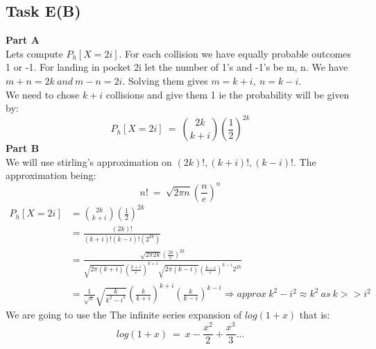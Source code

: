 \documentclass[12pt]{article}
\begin{document}
\subsection{Task E(B)}
\textbf{Part A}
\\
Lets compute $P_{h}[X=2i]$. For each collision we have equally probable outcomes 1 or -1. For landing in pocket 2i let the number of 1's and -1's be m, n.
We have $m+n=2k \ and\ m-n=2i$. Solving them gives $m=k+i,\ n=k-i$. \\
We need to chose $k+i$ collisions and give them 1 ie the probability will be given by:
\begin{equation}
    P_{h}[X=2i]\ =\ \binom{2k}{k+i}\left(\frac{1}{2}\right)^{2k} 
\end{equation} 
\textbf{Part B} \\
We will use stirling's approximation on $(2k)!,(k+i)!,(k-i)!$. The approximation being:
\[n!\ =\ \sqrt{2\pi n}\left(\frac{n}{e}\right)^{n}\]
\begin{equation}
\begin{split}
    P_{h}[X=2i] &=\binom{2k}{k+i}\left(\frac{1}{2}\right)^{2k} \\
                &=\frac{(2k)!}{(k+i)!(k-i)!(2^{2k})} \\
                &=\frac{\sqrt{2\pi 2k}\left(\frac{2k}{e}\right)^{2k}}{\sqrt{2\pi (k+i)}\left(\frac{k+i}{e}\right)^{k+i}\sqrt{2\pi (k-i)}\left(\frac{k-i}{e}\right)^{k-i}2^{2k}} \\
                &=\frac{1}{\sqrt{\pi}}\sqrt{\frac{k}{k^2-i^2}}\left(\frac{k}{k+i}\right)^{k+i}\left(\frac{k}{k-i}\right)^{k-i} \Rightarrow approx\ k^2-i^2\approx k^2\ as\ k>>i^2
\end{split}
\end{equation}
We are going to use the The infinite series expansion of $log(1+x)$ that is:
\[log(1+x)\ =\ x-\frac{x^2}{2}+\frac{x^3}{3} \dots\]
\end{document}
